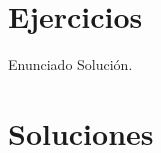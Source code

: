 \newpage





\section{Ejercicios}

\tcbstartrecording
\begin{texercise}
	Enunciado
	\tcblower 
    Solución.
\end{texercise}

\tcbstoprecording

\section{{Soluciones}}

\tcbinputrecords